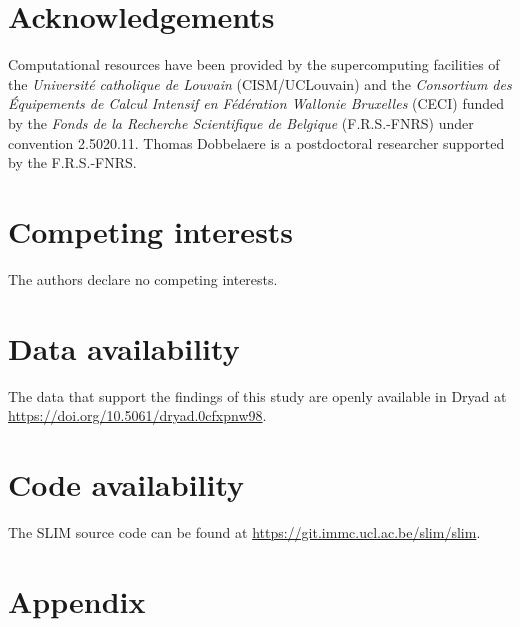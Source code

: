 \documentclass[fleqn,10pt]{wlscirep}
\begin{document}
\section*{Acknowledgements}
Computational resources have been provided by the supercomputing facilities of the \emph{Universit\'e catholique de Louvain} (CISM/UCLouvain) and the \textit{Consortium des \'Equipements de Calcul Intensif en F\'ed\'eration Wallonie Bruxelles} (CECI) funded by the \textit{Fonds de la Recherche Scientifique de Belgique} (F.R.S.-FNRS) under convention 2.5020.11. Thomas Dobbelaere is a postdoctoral researcher supported by the F.R.S.-FNRS.

\section*{Competing interests}
The authors declare no competing interests.

\section*{Data availability}
The data that support the findings of this study are openly available in Dryad at \href{https://doi.org/10.5061/dryad.0cfxpnw98}{https://doi.org/10.5061/dryad.0cfxpnw98}.

\section*{Code availability}
The SLIM source code can be found at \href{https://git.immc.ucl.ac.be/slim/slim}{https://git.immc.ucl.ac.be/slim/slim}.



\section*{Appendix}
\end{document}
